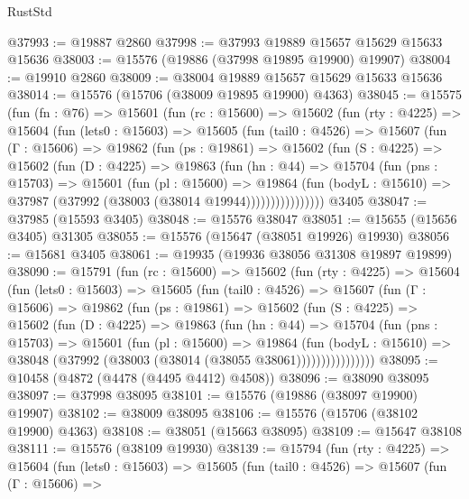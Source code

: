 \begin{lexlean}{RustStd}
\begin{coremodule}
@37993 := @19887 @2860
@37998 := @37993 @19889 @15657 @15629 @15633 @15636
@38003 := @15576 (@19886 (@37998 @19895 @19900) @19907)
@38004 := @19910 @2860
@38009 := @38004 @19889 @15657 @15629 @15633 @15636
@38014 := @15576 (@15706 (@38009 @19895 @19900) @4363)
@38045 := @15575
    (fun (fn : @76) =>
    @15601
      (fun (rc : @15600) =>
      @15602
        (fun (rty : @4225) =>
        @15604
          (fun (lets0 : @15603) =>
          @15605
            (fun (tail0 : @4526) =>
            @15607
              (fun (Γ : @15606) =>
              @19862
                (fun (ps : @19861) =>
                @15602
                  (fun (S : @4225) =>
                  @15602
                    (fun (D : @4225) =>
                    @19863
                      (fun (hn : @44) =>
                      @15704
                        (fun (pns : @15703) =>
                        @15601
                          (fun (pl : @15600) =>
                          @19864
                            (fun (bodyL : @15610) =>
                            @37987 (@37992 (@38003 (@38014 @19944))))))))))))))))
    @3405
@38047 := @37985 (@15593 @3405)
@38048 := @15576 @38047
@38051 := @15655 (@15656 @3405) @31305
@38055 := @15576 (@15647 (@38051 @19926) @19930)
@38056 := @15681 @3405
@38061 := @19935 (@19936 @38056 @31308 @19897 @19899)
@38090 := @15791
    (fun (rc : @15600) =>
    @15602
      (fun (rty : @4225) =>
      @15604
        (fun (lets0 : @15603) =>
        @15605
          (fun (tail0 : @4526) =>
          @15607
            (fun (Γ : @15606) =>
            @19862
              (fun (ps : @19861) =>
              @15602
                (fun (S : @4225) =>
                @15602
                  (fun (D : @4225) =>
                  @19863
                    (fun (hn : @44) =>
                    @15704
                      (fun (pns : @15703) =>
                      @15601
                        (fun (pl : @15600) =>
                        @19864
                          (fun (bodyL : @15610) =>
                          @38048 (@37992 (@38003 (@38014 (@38055 @38061))))))))))))))))
@38095 := @10458 (@4872 (@4478 (@4495 @4412) @4508))
@38096 := @38090 @38095
@38097 := @37998 @38095
@38101 := @15576 (@19886 (@38097 @19900) @19907)
@38102 := @38009 @38095
@38106 := @15576 (@15706 (@38102 @19900) @4363)
@38108 := @38051 (@15663 @38095)
@38109 := @15647 @38108
@38111 := @15576 (@38109 @19930)
@38139 := @15794
    (fun (rty : @4225) =>
    @15604
      (fun (lets0 : @15603) =>
      @15605
        (fun (tail0 : @4526) =>
        @15607
          (fun (Γ : @15606) =>

\end{coremodule}
\end{lexlean}
